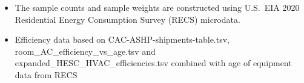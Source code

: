 \begin{itemize}
\item The sample counts and sample weights are constructed using U.S.~EIA 2020 Residential Energy Consumption Survey (RECS) microdata.
\item Efficiency data based on CAC-ASHP-shipments-table.tsv, room\_AC\_efficiency\_vs\_age.tsv and expanded\_HESC\_HVAC\_efficiencies.tsv combined with age of equipment data from RECS
\end{itemize}
